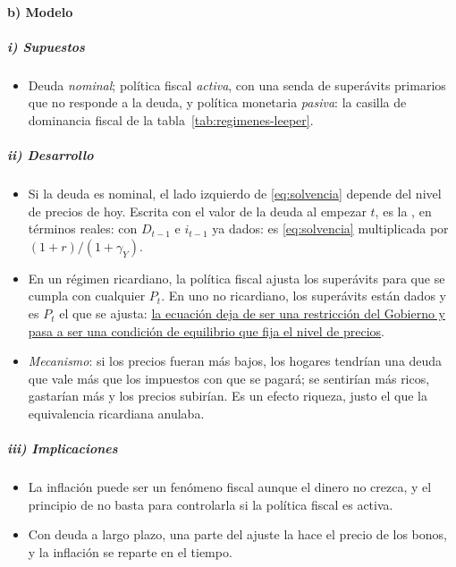 \documentclass[11pt]{article}
\begin{document}
\paragraph{b) Modelo}

\subparagraph{i) Supuestos}

\begin{itemize}
\item Deuda \emph{nominal}; política fiscal \emph{activa}, con una senda de superávits primarios que no responde a la deuda, y política monetaria \emph{pasiva}: la casilla de dominancia fiscal de la tabla~\ref{tab:regimenes-leeper}.
\end{itemize}

\subparagraph{ii) Desarrollo}

\begin{itemize}
\item Si la deuda es nominal, el lado izquierdo de \eqref{eq:solvencia} depende del nivel de precios de hoy. Escrita con el valor de la deuda al empezar $t$, es la , en términos reales:
  con $D_{t-1}$ e $i_{t-1}$ ya dados: es \eqref{eq:solvencia} multiplicada por $(1+r)/(1+\gamma_Y)$.
\item En un régimen ricardiano, la política fiscal ajusta los superávits para que se cumpla con cualquier $P_t$. En uno no ricardiano, los superávits están dados y es $P_t$ el que se ajusta: \uline{la ecuación deja de ser una restricción del Gobierno y pasa a ser una condición de equilibrio que fija el nivel de precios}.
\item \emph{Mecanismo}: si los precios fueran más bajos, los hogares tendrían una deuda que vale más que los impuestos con que se pagará; se sentirían más ricos, gastarían más y los precios subirían. Es un efecto riqueza, justo el que la equivalencia ricardiana anulaba.
\end{itemize}

\subparagraph{iii) Implicaciones}

\begin{itemize}
\item La inflación puede ser un fenómeno fiscal aunque el dinero no crezca, y el principio de  no basta para controlarla si la política fiscal es activa.
\item Con deuda a largo plazo, una parte del ajuste la hace el precio de los bonos, y la inflación se reparte en el tiempo\nocite{Cochrane2023Fiscal}.
\end{itemize}
\end{document}
